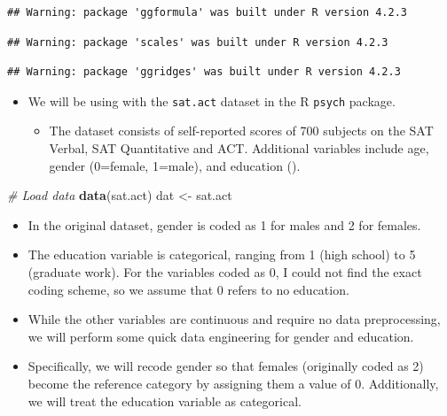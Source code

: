 \documentclass[
]{book}
\newenvironment{Shaded}{\begin{snugshade}}{\end{snugshade}}
\newcommand{\CommentTok}[1]{\textcolor[rgb]{0.56,0.35,0.01}{\textit{#1}}}
\newcommand{\FunctionTok}[1]{\textcolor[rgb]{0.13,0.29,0.53}{\textbf{#1}}}
\newcommand{\NormalTok}[1]{#1}
\newcommand{\OtherTok}[1]{\textcolor[rgb]{0.56,0.35,0.01}{#1}}
\providecommand{\tightlist}{%
  \setlength{\itemsep}{0pt}\setlength{\parskip}{0pt}}
\begin{document}
\begin{verbatim}
## Warning: package 'ggformula' was built under R version 4.2.3
\end{verbatim}

\begin{verbatim}
## Warning: package 'scales' was built under R version 4.2.3
\end{verbatim}

\begin{verbatim}
## Warning: package 'ggridges' was built under R version 4.2.3
\end{verbatim}

\begin{itemize}
\tightlist
\item
  We will be using with the \texttt{sat.act} dataset in the R \texttt{psych} package.

  \begin{itemize}
  \tightlist
  \item
    The dataset consists of self-reported scores of 700 subjects on the SAT Verbal, SAT Quantitative and ACT. Additional variables include age, gender (0=female, 1=male), and education ().
  \end{itemize}
\end{itemize}

\begin{Shaded}
\begin{Highlighting}[]
\CommentTok{\# Load data}
\FunctionTok{data}\NormalTok{(sat.act)}
\NormalTok{dat }\OtherTok{\textless{}{-}}\NormalTok{ sat.act}
\end{Highlighting}
\end{Shaded}

\begin{itemize}
\item
  In the original dataset, gender is coded as 1 for males and 2 for females.
\item
  The education variable is categorical, ranging from 1 (high school) to 5 (graduate work). For the variables coded as 0, I could not find the exact coding scheme, so we assume that 0 refers to no education.
\item
  While the other variables are continuous and require no data preprocessing, we will perform some quick data engineering for gender and education.
\item
  Specifically, we will recode gender so that females (originally coded as 2) become the reference category by assigning them a value of 0. Additionally, we will treat the education variable as categorical.
\end{itemize}
\end{document}
